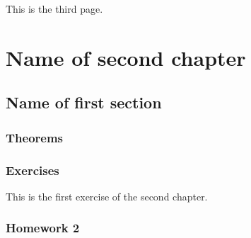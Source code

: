 \documentclass[11pt, a4paper]{book}
\begin{document}
\newpage
This is the third page.
%
\chapter{Name of second chapter}
%
\section{Name of first section}
\subsection{Theorems}
\subsection{Exercises}
\begin{exercise}
    This is the first exercise of the second chapter.
\end{exercise}
\subsection{Homework 2}
\end{document}
